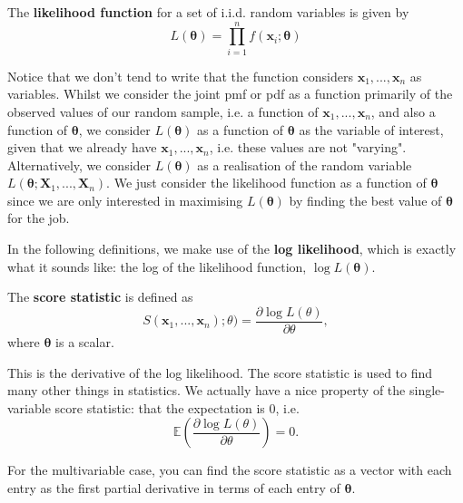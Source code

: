 \begin{definition}\label{defn:likelihood func}
    The \textbf{likelihood function} for a set of i.i.d. random variables is given by
    \begin{equation}\label{eq:likelihood func}
        L(\bm{\theta}) = \prod_{i=1}^n f(\bm{x}_i;\bm{\theta})
    \end{equation}
\end{definition}

Notice that we don't tend to write that the function considers \(\bm{x}_1,...,\bm{x}_n\) as variables. 
Whilst we consider the joint pmf or pdf as a function primarily of the observed values of our random sample, i.e. a function of \(\bm{x}_1,...,\bm{x}_n\), and also a function of \(\bm{\theta}\), we consider \(L(\bm{\theta})\) as a function of \(\bm{\theta}\) as the variable of interest, given that we already have \(\bm{x}_1,...,\bm{x}_n\), i.e. these values are not "varying".
Alternatively, we consider \(L(\bm{\theta})\) as a realisation of the random variable \(L(\bm{\theta};\bm{X}_1,...,\bm{X}_n)\).
We just consider the likelihood function as a function of \(\bm{\theta}\) since we are only interested in maximising \(L(\bm{\theta})\) by finding the best value of \(\bm{\theta}\) for the job. 

\bigskip

In the following definitions, we make use of the \textbf{log likelihood}, which is exactly what it sounds like: the log of the likelihood function, \(\log L(\bm{\theta})\). 

\begin{definition}\label{defn:score stat}
    The \textbf{score statistic} is defined as 
    \begin{equation}\label{eq:score stat}
        S(\bm{x}_1,...,\bm{x}_n);\theta) = \frac{\partial \log L(\theta)}{\partial \theta},
    \end{equation}
    where \(\bm{\theta}\) is a scalar. 
\end{definition}

This is the derivative of the log likelihood. 
The score statistic is used to find many other things in statistics. 
We actually have a nice property of the single-variable score statistic: that the expectation is \(0\), i.e. \[\mathbb{E}\left(\frac{\partial \log L(\theta)}{\partial \theta}\right) = 0.\]

\medskip 

For the multivariable case, you can find the score statistic as a vector with each entry as the first partial derivative in terms of each entry of \(\bm{\theta}\). 

